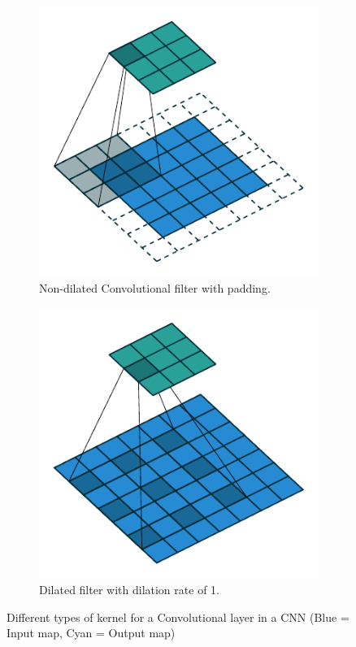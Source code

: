 \begin{figure}[h!]
    \centering
    \begin{subfigure}{0.45\textwidth}
        \centering
        \includegraphics[width=\linewidth]{Figures/Chp2_CNN/FIG2A.pdf}
        \caption{Non-dilated Convolutional filter with padding.}
        \label{subfig:CNN_FIG2A}
    \end{subfigure}
    \begin{subfigure}{0.45\textwidth}
        \centering
        \includegraphics[width=\linewidth]{Figures/Chp2_CNN/FIG2B.pdf}
        \caption{Dilated filter with dilation rate of 1.}
        \label{subfig:CNN_FIG2B}
    \end{subfigure}
    \caption{Different types of kernel for a Convolutional layer in a CNN \parencite{dumoulin2016guide} (Blue = Input map, Cyan = Output map)}
\end{figure}

